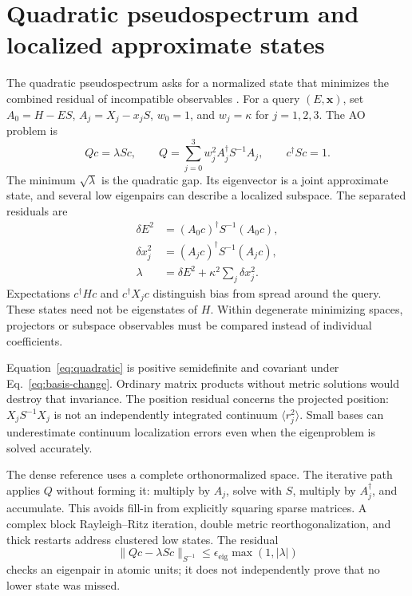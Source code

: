 \section{Quadratic pseudospectrum and localized approximate states}
\label{sec:quadratic}
The quadratic pseudospectrum asks for a normalized state that minimizes
the combined residual of incompatible observables \cite{Cerjan2023}.
For a query $(E,\bm x)$, set $A_0=H-ES$, $A_j=X_j-x_jS$,
$w_0=1$, and $w_j=\kappa$ for $j=1,2,3$. The AO problem is
\begin{equation}
 Qc=\lambda Sc,\qquad
 Q=\sum_{j=0}^3 w_j^2 A_j^\dagger S^{-1}A_j,\qquad c^\dagger Sc=1 .
 \label{eq:quadratic}
\end{equation}
The minimum $\sqrt{\lambda}$ is the quadratic gap.
Its eigenvector is a joint approximate state, and several low
eigenpairs can describe a localized subspace.
The separated residuals are
\begin{equation}
 \begin{split}
 \delta E^2&=(A_0c)^\dagger S^{-1}(A_0c),\\
 \delta x_j^2&=(A_jc)^\dagger S^{-1}(A_jc),\\
 \lambda&=\delta E^2+\kappa^2\sum_j\delta x_j^2 .
 \end{split}
 \label{eq:quadratic-residuals}
\end{equation}
Expectations $c^\dagger Hc$ and $c^\dagger X_jc$ distinguish bias from
spread around the query. These states need not be eigenstates of $H$.
Within degenerate minimizing spaces, projectors or subspace observables
must be compared instead of individual coefficients.

Equation~\eqref{eq:quadratic} is positive semidefinite and covariant
under Eq.~\eqref{eq:basis-change}. Ordinary matrix products without
metric solutions would destroy that invariance.
The position residual concerns the projected position:
$X_jS^{-1}X_j$ is not an independently integrated continuum
$\langle r_j^2\rangle$. Small bases can underestimate continuum
localization errors even when the eigenproblem is solved accurately.

The dense reference uses a complete orthonormalized space.
The iterative path applies $Q$ without forming it: multiply by
$A_j$, solve with $S$, multiply by $A_j^\dagger$, and accumulate.
This avoids fill-in from explicitly squaring sparse matrices.
A complex block Rayleigh--Ritz iteration, double metric
reorthogonalization, and thick restarts address clustered low states.
The residual
\[
 \|Qc-\lambda Sc\|_{S^{-1}}
 \leq\epsilon_{\mathrm{eig}}\max(1,|\lambda|)
\]
checks an eigenpair in atomic units; it does not independently prove
that no lower state was missed.

